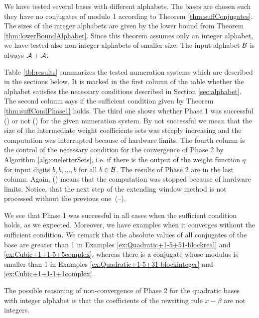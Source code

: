 We have tested several bases with different alphabets. The bases are chosen such they have no conjugates of modulo 1 according to Theorem \ref{thm:suffConjugates}. The sizes of the integer alphabets are given by the lower bound from Theorem \ref{thm:lowerBoundAlphabet}. Since this theorem assumes only an integer alphabet, we have tested also non-integer alphabets of smaller size. The input alphabet $\mathcal{B}$ is always $\mathcal{A}+ \mathcal{A}$.  

 Table \ref{tbl:results} summarizes the tested numeration systems which are described in the sections below. It is marked in the first column of the table whether the alphabet satisfies the necessary conditions described in Section \ref{sec:alphabet}. The second column says if the sufficient condition given by Theorem \ref{thm:suffCondPhase1} holds. The third one shows whether Phase 1 was successful (\checkmark) or not (\xmark) for the given numeration system. By not successful we mean that the size of the intermediate weight coefficients sets was steeply increasing and the computation was interrupted because of hardware limits. The fourth column is the control of the necessary condition for the convergence of Phase 2 by Algorithm \ref{alg:oneletterSets}, i.e. if there is the output of the weight function $q$ for input digits $b,b,\dots,b$ for all $b\in\mathcal{B}$. The results of Phase 2 are in the last column. Again, (\xmark) means that the computation was stopped because of hardware limits. Notice, that the next step of the extending window method is not processed without the previous one~(--).

We see that Phase 1 was successful in all cases when the sufficient condition holds, as we expected. Moreover, we have examples when it converges without the sufficient condition. We remark that the absolute values of all conjugates of the base are greater than 1 in Examples \ref{ex:Quadratic+1-5+51-blockreal} and \ref{ex:Cubic+1+1-5+5complex}, whereas there is a conjugate whose modulus is smaller than 1 in Examples \ref{ex:Quadratic+1-5+31-blockinteger} and \ref{ex:Cubic+1+1-1+1complex}.


 
The possible reasoning of non-convergence of Phase 2 for the quadratic bases with integer alphabet is that the coefficients of the rewriting rule $x-\beta$ are not integers.  

